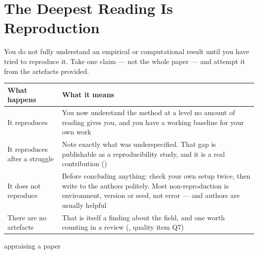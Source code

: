 \section{The Deepest Reading Is Reproduction}

You do not fully understand an empirical or computational result until you have
tried to reproduce it. Take one claim --- not the whole paper --- and attempt
it from the artefacts provided.

\begin{center}
\small
\begin{tabular}{@{}L{4.6cm}L{9.7cm}@{}}
\toprule
\textbf{What happens} & \textbf{What it means} \\
\midrule
It reproduces
  & You now understand the method at a level no amount of reading gives you,
    and you have a working baseline for your own work \\
It reproduces after a struggle
  & Note exactly what was underspecified. That gap is publishable as a
    reproducibility study, and it is a real contribution
    () \\
It does not reproduce
  & Before concluding anything: check your own setup twice, then write to the
    authors politely. Most non-reproduction is environment, version or seed,
    not error --- and authors are usually helpful \\
There are no artefacts
  & That is itself a finding about the field, and one worth counting in a
    review (, quality item Q7) \\
\bottomrule
\end{tabular}
\end{center}

\begin{traditions}{appraising a paper}
\end{traditions}

